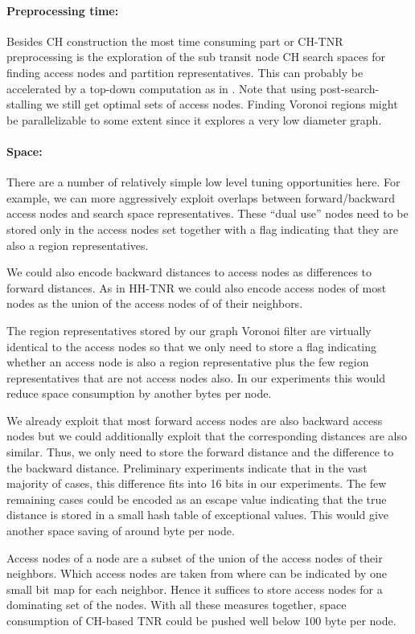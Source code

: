 \documentclass{llncs}
\begin{document}
\paragraph*{Preprocessing time:} Besides CH construction the most time consuming part or CH-TNR preprocessing is the exploration of the sub transit node CH search spaces for finding access nodes and partition representatives. This can probably be accelerated by a top-down computation as in \cite{adgw-hhlsp-12}.
Note that using post-search-stalling we still get optimal sets of access nodes.
Finding Voronoi regions might be parallelizable to some extent since it explores a very low diameter graph.

\paragraph*{Space:} 
There are a number of relatively simple low level tuning opportunities here. 
For example, we can more aggressively exploit overlaps between forward/backward access nodes and search space representatives.
These ``dual use'' nodes need to be stored only in the access nodes set together with a flag indicating that they are also a region representatives.

We could also encode backward distances to access nodes as differences to forward distances. As in HH-TNR we could also encode access nodes of most nodes as the union of the access nodes of of their neighbors.

The region representatives stored by our graph Voronoi filter are virtually identical to the access nodes so that we only need to store a flag indicating whether an access node is also a region representative plus the few region representatives that are not access nodes also. 
In our experiments this would reduce space consumption by another  bytes per node. 

We already exploit that most forward access nodes are also backward access nodes but we could additionally exploit that the corresponding distances are also similar. 
Thus, we only need to store the forward distance and the difference to the backward distance. 
Preliminary experiments indicate that in the vast majority of cases, this difference fits into 16 bits in our experiments. 
The few remaining cases could be encoded as an escape value indicating that the true distance is stored in a small hash table of exceptional values. 
This would give another space saving of around  byte per node.

Access nodes of a node  are a subset of the union of the access nodes of their neighbors. 
Which access nodes are taken from where can be indicated by one small bit map for each neighbor. 
Hence it suffices to store access nodes for a dominating set of the nodes.
With all these measures together, space consumption of CH-based TNR could be pushed well below 100 byte per node.




\clearpage
\end{document}
